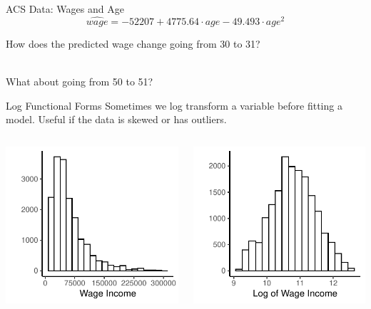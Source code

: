 \documentclass{./../div_teaching_slides}
\begin{document}
\begin{frame}{ACS Data: Wages and Age}
$$ \hat{wage} = -52207 + 4775.64 \cdot age -49.493 \cdot age^2   $$
\vspace{1em}

How does the predicted wage change going from 30 to 31? \\~\\ \vspace{2em}

What about going from 50 to 51?
\end{frame}

\begin{frame}{Log Functional Forms}
\vspace{-0.75em}
Sometimes we  log transform a variable before fitting a model. Useful if the data is skewed or has outliers.\vspace{-0.25em}
 \begin{columns}[T]
\begin{column}{0.5\textwidth}
\includegraphics{./../../output/lrm_ff_hist_wages.pdf}
\end{column}	
\begin{column}{0.65\textwidth}
\includegraphics{./../../output/lrm_ff_hist_lwages.pdf}

\end{column}
\end{columns}
\end{frame}
\end{document}
